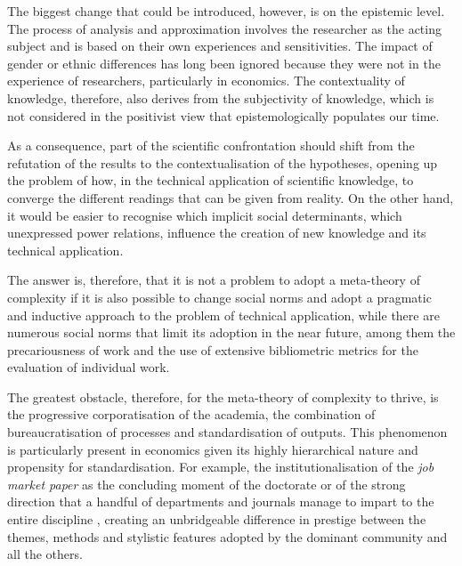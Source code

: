 \documentclass[a4paper, headings=standardclasses]{scrartcl}
\begin{document}
The biggest change that could be introduced, however, is on the epistemic level.
The process of analysis and approximation involves the researcher as the acting subject and is based on their own experiences and sensitivities.
The impact of gender or ethnic differences has long been ignored because they were not in the experience of researchers, particularly in economics.
The contextuality of knowledge, therefore, also derives from the subjectivity of knowledge, which is not considered in the positivist view that epistemologically populates our time.

As a consequence, part of the scientific confrontation should shift from the refutation of the results to the contextualisation of the hypotheses, opening up the problem of how, in the technical application of scientific knowledge, to converge the different readings that can be given from reality.
On the other hand, it would be easier to recognise which implicit social determinants, which unexpressed power relations, influence the creation of new knowledge and its technical application.

The answer is, therefore, that it is not a problem to adopt a meta-theory of complexity if it is also possible to change social norms and adopt a pragmatic and inductive approach to the problem of technical application, while there are numerous social norms that limit its adoption in the near future, among them the precariousness of work and the use of extensive bibliometric metrics for the evaluation of individual work.

The greatest obstacle, therefore, for the meta-theory of complexity to thrive, is the progressive corporatisation of the academia, the combination of bureaucratisation of processes and standardisation of outputs. 
This phenomenon is particularly present in economics given its highly hierarchical nature and propensity for standardisation. For example, the institutionalisation of the \textit{job market paper} as the concluding moment of the doctorate or of the strong direction that a handful of departments and journals manage to impart to the entire discipline \parencite{heckman2020, aistleitner2023}, creating an unbridgeable difference in prestige between the themes, methods and stylistic features adopted by the dominant community and all the others.

\begin{refcontext}[sorting=nyt]
	\printbibliography
\end{refcontext}
\end{document}
